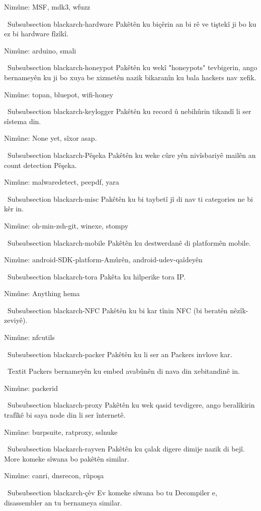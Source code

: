 Nimûne: MSF, mdk3, wfuzz

\ Subsubsection {blackarch-hardware}
Pakêtên ku biçêrin an bi rê ve tiştekî ji bo ku ez bi
hardware fîzîkî.

Nimûne: arduino, smali

\ Subsubsection {blackarch-honeypot}
Pakêtên ku wekî "honeypots" tevbigerin, ango bernameyên ku ji bo xuya
be xizmetên nazik bikaranîn ku bala hackers nav xefik.

Nimûne: topan, bluepot, wifi-honey

\ Subsubsection {blackarch-keylogger}
Pakêtên ku record û nebihûrin tikandî li ser sîstema din.

Nimûne: None yet, sîxor asap.

\ Subsubsection {blackarch-Pêşeka}
Pakêtên ku weke cûre yên nivîsbariyê mailên an count
detection Pêşeka.

Nimûne: malwaredetect, peepdf, yara

\ Subsubsection {blackarch-misc}
Pakêtên ku bi taybetî jî di nav ti categories ne bi kêr in.

Nimûne: oh-min-zsh-git, winexe, stompy

\ Subsubsection {blackarch-mobile}
Pakêtên ku destwerdanê di platformên mobile.

Nimûne: android-SDK-platform-Amûrên, android-udev-qaîdeyên

\ Subsubsection {blackarch-tora}
Pakêta ku hilperike tora IP.

Nimûne: Anything hema

\ Subsubsection {blackarch-NFC}
Pakêtên ku bi kar tînin NFC (bi beratên nêzîk-zeviyê).

Nimûne: nfcutils

\ Subsubsection {blackarch-packer}
Pakêtên ku li ser an Packers invlove kar.

\ Textit {Packers bernameyên ku embed avabûnên di nava din xebitandinê in.}

Nimûne: packerid

\ Subsubsection {blackarch-proxy}
Pakêtên ku wek qasid tevdigere, ango beralîkirin trafîkê
bi saya node din li ser înternetê.

Nimûne: burpsuite, ratproxy, sslnuke

\ Subsubsection {blackarch-rayven}
Pakêtên ku çalak digere dimije nazik di
bejî. More komeke sîwana bo pakêtên similar.

Nimûne: canri, dnsrecon, rûpoşa

\ Subsubsection {blackarch-çêv}
Ev komeke sîwana bo tu Decompiler e,
disassembler an tu bernameya similar.

